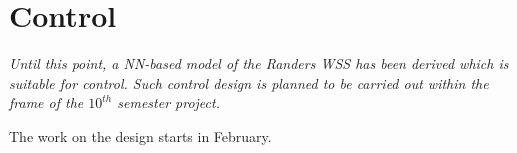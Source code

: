 \chapter{Control}
\label{unspecified}

\emph{Until this point, a NN-based model of the Randers WSS has been derived which is suitable for control. Such control design is planned to be carried out within the frame of the $10^{th}$ semester project.}

The work on the design starts in February. 